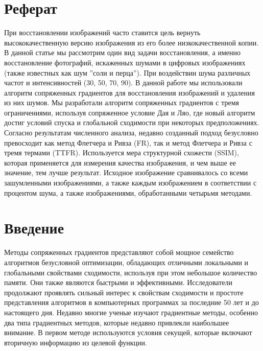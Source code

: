 



\makeatletter
\newcommand{\stackover}{\genfrac{.}{.}\z@{}}
\makeatother

\null
\vspace{\baselineskip}
\section*{Реферат}

При восстановлении изображений часто ставится цель вернуть высококачественную
версию изображения из его более низкокачественной копии. В данной статье мы
рассмотрим один вид задачи восстановления, а именно восстановление фотографий,
искаженных шумами в цифровых изображениях (также известных как шум ''соли и перца'').
При воздействии шума различных частот и интенсивностей (30, 50, 70, 90).
В данной работе мы использовали алгоритм сопряженных градиентов для
восстановления изображений и удаления из них шумов. Мы разработали алгоритм
сопряженных градиентов с тремя ограничениями, используя сопряженное условие Дая
и Ляо, где новый алгоритм достиг условий спуска и глобальной сходимости при
некоторых предположениях. Согласно результатам численного анализа, недавно
созданный подход безусловно превосходит как метод Флетчера и Ривза (FR), так и
метод Флетчера и Ривза с тремя термами (TTFR). Используется мера структурной
схожести (SSIM), которая применяется для измерения качества изображения, и чем
выше ее значение, тем лучше результат. Исходное изображение сравнивалось со
всеми зашумленными изображениями, а также каждым изображением в соответствии с
процентом шума, а также изображениями, обработанными четырьмя методами.

\section{Введение}

Методы сопряженных градиентов представляют собой мощное семейство алгоритмов
безусловной оптимизации, обладающих отличными локальными и глобальными
свойствами сходимости, используя при этом небольшое количество памяти. Они также
являются быстрыми и эффективными. Исследователи продолжают проявлять сильный
интерес к свойствам сходимости и простоте представления алгоритмов в
компьютерных программах за последние 50 лет и до настоящего дня. Недавно многие
ученые изучают градиентные методы, особенно два типа градиентных методов,
которые недавно привлекли наибольшее внимание. В первом методе используются
условия секущей, которые включают вторичную информацию из целевой функции.

